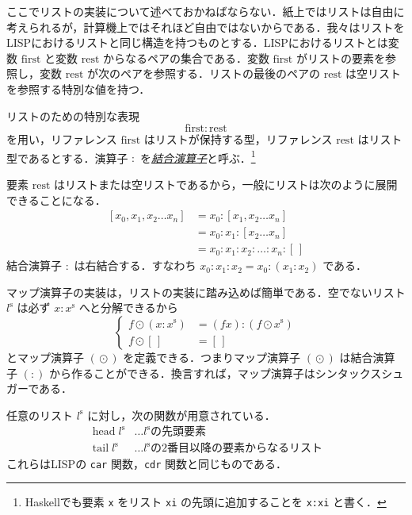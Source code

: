 \documentclass[a4paper,draft]{jsbook}
\newcommand{\programminglanguage}[1]{\textsf{#1}}
\newcommand{\haskell}{\programminglanguage{Haskell}}
\newcommand{\lisp}{\programminglanguage{LISP}}
\newcommand{\keyword}[1]{{\underline{\emph{#1}}}}
\newcommand{\code}[1]{\texttt{#1}}
\newcommand{\mSpecialVar}[1]{\mathrm{#1}} %
\newcommand{\mFirstVar}{\mSpecialVar{first}}
\newcommand{\mRestVar}{\mSpecialVar{rest}}
\newcommand{\mEmptyList}{{[\,]}}
\newcommand{\mListWith}[1]{\left[#1\right]}
\newcommand{\mList}[1]{{#1}^\mathrm{s}}
\DeclareMathOperator{\mMapList}{\odot}
\DeclareMathOperator{\mHead}{head}
\DeclareMathOperator{\mTail}{tail}
\newcommand{\mathVarKeyword}[1]{\operatorname{\mathrm{#1}}}
\newcommand{\mFirstVar}{\mathVarKeyword{first}}
\begin{document}
ここでリストの実装について述べておかねばならない．紙上ではリストは自由に考えられるが，計算機上ではそれほど自由ではないからである．我々はリストを\lisp におけるリストと同じ構造を持つものとする．\lisp におけるリストとは変数 $\mFirstVar$ と変数 $\mRestVar$ からなるペアの集合である．変数 $\mFirstVar$ がリストの要素を参照し，変数 $\mRestVar$ が次のペアを参照する．リストの最後のペアの $\mRestVar$ は空リストを参照する特別な値を持つ．

リストのための特別な表現
\begin{equation}
\mFirstVar:\mRestVar
\end{equation}
を用い，リファレンス $\mFirstVar$ はリストが保持する型，リファレンス $\mRestVar$ はリスト型であるとする．演算子 $:$ を\keyword{結合演算子}と呼ぶ．\footnote{\haskell でも要素 \code{x} をリスト \code{xi} の先頭に追加することを \code{x:xi} と書く．}

要素 $\mRestVar$ はリストまたは空リストであるから，一般にリストは次のように展開できることになる．
\begin{align*}
\mListWith{x_0,x_1,x_2\dots x_n}
  &=x_0:\mListWith{x_1,x_2\dots x_n}\\
  &=x_0:x_1:\mListWith{x_2\dots x_n}\\
  &=x_0:x_1:x_2:\dots:x_n:\mEmptyList
\end{align*}
結合演算子 $:$ は右結合する．すなわち $x_0:x_1:x_2=x_0:(x_1:x_2)$ である．

マップ演算子の実装は，リストの実装に踏み込めば簡単である．空でないリスト $\mList{l}$ は必ず $x:\mList{x}$ へと分解できるから
\begin{equation}
\left\{
\begin{split}
f\mMapList{}(x:\mList{x})
  &=(fx):(f\mMapList\mList{x})\\
f\mMapList\mEmptyList
  &=\mEmptyList
\end{split}
\right.
\end{equation}
とマップ演算子 $(\mMapList)$ を定義できる．つまりマップ演算子 $(\mMapList)$ は結合演算子 $(:)$ から作ることができる．換言すれば，マップ演算子はシンタックスシュガーである．

任意のリスト $\mList{l}$ に対し，次の関数が用意されている．
\begin{align*}
\mHead\mList{l}&\dots\text{$\mList{l}$の先頭要素}\\
\mTail\mList{l}&\dots\text{$\mList{l}$の2番目以降の要素からなるリスト}
\end{align*}
これらは\lisp  の \code{car} 関数，\code{cdr} 関数と同じものである．
\end{document}
